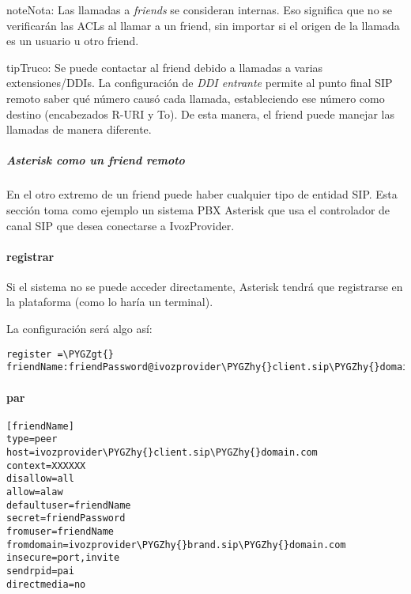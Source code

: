 \documentclass[letterpaper,10pt,spanish]{sphinxmanual}
\def\PYGZgt{\char`\>}
\def\PYGZhy{\char`\-}
\begin{document}
\begin{notice}{note}{Nota:}
Las llamadas a \emph{friends} se consideran internas. Eso significa que no se verificarán las ACLs al llamar a un friend, sin importar si el origen de la llamada es un usuario u otro friend.
\end{notice}

\begin{notice}{tip}{Truco:}
Se puede contactar al friend debido a llamadas a varias extensiones/DDIs. La configuración de \emph{DDI entrante} permite al punto final SIP remoto saber qué número causó cada llamada, estableciendo ese número como destino (encabezados R-URI y To). De esta manera, el friend puede manejar las llamadas de manera diferente.
\end{notice}


\subparagraph{Asterisk como un friend remoto}
\label{administration_portal/client/vpbx/routing_endpoints/friends/remote_friends:asterisk-as-a-remote-friend}
En el otro extremo de un friend puede haber cualquier tipo de entidad SIP. Esta sección toma como ejemplo un sistema PBX Asterisk que usa el controlador de canal SIP que desea conectarse a IvozProvider.
\paragraph{registrar}

Si el sistema no se puede acceder directamente, Asterisk tendrá que registrarse en la plataforma (como lo haría un terminal).

La configuración será algo así:

\begin{Verbatim}[commandchars=\\\{\}]
register =\PYGZgt{} friendName:friendPassword@ivozprovider\PYGZhy{}client.sip\PYGZhy{}domain.com
\end{Verbatim}
\paragraph{par}

\begin{Verbatim}[commandchars=\\\{\}]
[friendName]
type=peer
host=ivozprovider\PYGZhy{}client.sip\PYGZhy{}domain.com
context=XXXXXX
disallow=all
allow=alaw
defaultuser=friendName
secret=friendPassword
fromuser=friendName
fromdomain=ivozprovider\PYGZhy{}brand.sip\PYGZhy{}domain.com
insecure=port,invite
sendrpid=pai
directmedia=no
\end{Verbatim}
\end{document}
